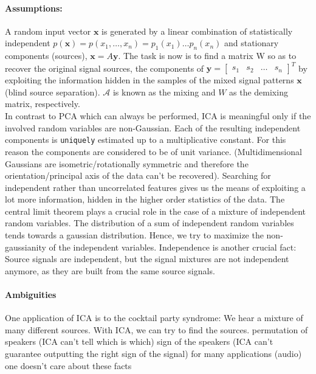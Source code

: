 \documentclass[11pt]{article}
\begin{document}
\paragraph{Assumptions:} A random input vector $\mathbf{x}$ is generated by a linear combination of statistically independent $p(\mathbf{x})=p(x_1,\dots,x_n)=p_1(x_1)\dots p_n(x_n)$ and stationary components (sources), $\mathbf{x}=A\mathbf{y}$. The task is now is to find a matrix W so as to recover the original signal sources, the components of $\mathbf{y}=\begin{bmatrix}s_1 & s_2 & \dots & s_n\end{bmatrix}^T$ by exploiting the information hidden in the samples of the mixed signal patterns $\mathbf{x}$ (blind source separation). $\mathcal{A}$ is known as the mixing and $W$ as the demixing matrix, respectively.\\
In contrast to PCA which can always be performed, ICA is meaningful only if the involved random variables are non-Gaussian. Each of the resulting independent components is \texttt{uniquely} estimated up to a multiplicative constant. For this reason the components are considered to be of unit variance. (Multidimensional Gaussians are isometric/rotationally symmetric and therefore the orientation/principal axis of the data can't be recovered). %
Searching for independent rather than uncorrelated features gives us the means of exploiting a lot more information, hidden in the higher order statistics of the data.
The central limit theorem plays a crucial role in the case of a mixture of independent random variables. The distribution of a sum of independent random variables tends towards a gaussian distribution. Hence, we try to maximize the non-gaussianity of the independent variables.
Independence is another crucial fact: Source signals are independent, but the signal mixtures are not independent anymore, as they are built from the same source signals.

\paragraph{Ambiguities}
One application of ICA is to the cocktail party syndrome: We hear a mixture of many different sources. With ICA, we can try to find the sources.
permutation of speakers (ICA can't tell which is which)
sign of the speakers (ICA can't guarantee outputting the right sign of the signal)
for many applications (audio) one doesn't care about these facts
\end{document}
